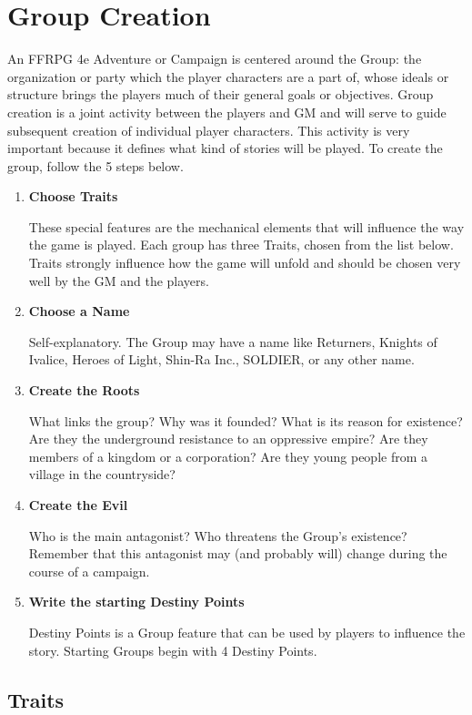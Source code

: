 \section{Group Creation}
An FFRPG 4e Adventure or Campaign is
centered around the Group: the organization or
party which the player characters are a part of,
whose ideals or structure brings the players much
of their general goals or objectives. Group creation
is a joint activity between the players and GM and
will serve to guide subsequent creation of
individual player characters. This activity is very
important because it defines what kind of stories
will be played. To create the group, follow the 5
steps below.
\begin{enumerate}

\item \textbf{Choose Traits}

These special features are the mechanical
elements that will influence the way the game is
played. Each group has three Traits, chosen from
the list below. Traits strongly influence how the
game will unfold and should be chosen very well
by the GM and the players.

\item \textbf{Choose a Name}

Self-explanatory. The Group may have a name like
Returners, Knights of Ivalice, Heroes of Light, Shin-Ra
Inc., SOLDIER, or any other name.

\item \textbf{Create the Roots}

What links the group? Why was it founded? What
is its reason for existence? Are they the
underground resistance to an oppressive empire?
Are they members of a kingdom or a corporation?
Are they young people from a village in the
countryside?

\item \textbf{Create the Evil}

Who is the main antagonist? Who threatens the
Group’s existence? Remember that this antagonist
may (and probably will) change during the course
of a campaign.

\item \textbf{Write the starting Destiny Points}

Destiny Points is a Group feature that can be used
by players to influence the story. Starting Groups
begin with 4 Destiny Points.
\end{enumerate}
\subsection{Traits}

